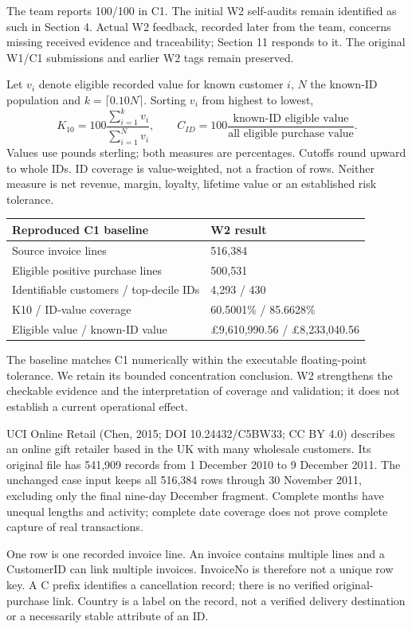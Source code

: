 \documentclass[10pt,a4paper]{article}
\newcommand{\sectionhead}[1]{\Needspace{8\baselineskip}\vspace{.4em}{\large\bfseries\color{navy}#1}\par\vspace{.1em}}
\begin{document}
The team reports 100/100 in C1. The initial W2 self-audits remain identified as such in Section 4. Actual W2 feedback, recorded later from the team, concerns missing received evidence and traceability; Section 11 responds to it. The original W1/C1 submissions and earlier W2 tags remain preserved.

Let $v_i$ denote eligible recorded value for known customer $i$, $N$ the known-ID population and $k=\lceil0.10N\rceil$. Sorting $v_i$ from highest to lowest,
\[
K_{10}=100\frac{\sum_{i=1}^{k}v_i}{\sum_{i=1}^{N}v_i},\qquad
C_{ID}=100\frac{\text{known-ID eligible value}}{\text{all eligible purchase value}}.
\]
Values use pounds sterling; both measures are percentages. Cutoffs round upward to whole IDs. ID coverage is value-weighted, not a fraction of rows. Neither measure is net revenue, margin, loyalty, lifetime value or an established risk tolerance.

\begin{tabularx}{\linewidth}{@{}YY@{}}
\toprule
\textbf{Reproduced C1 baseline} & \textbf{W2 result} \\ \midrule
Source invoice lines & 516,384 \\
Eligible positive purchase lines & 500,531 \\
Identifiable customers / top-decile IDs & 4,293 / 430 \\
K10 / ID-value coverage & 60.5001\% / 85.6628\% \\
Eligible value / known-ID value & \pounds{}9,610,990.56 / \pounds{}8,233,040.56 \\
\bottomrule\end{tabularx}

The baseline matches C1 numerically within the executable floating-point tolerance. We retain its bounded concentration conclusion. W2 strengthens the checkable evidence and the interpretation of coverage and validation; it does not establish a current operational effect.
\clearpage
\sectionhead{2\quad Source, dictionary and analytical scope}
UCI Online Retail (Chen, 2015; DOI 10.24432/C5BW33; CC BY 4.0) describes an online gift retailer based in the UK with many wholesale customers. Its original file has 541,909 records from 1 December 2010 to 9 December 2011. The unchanged case input keeps all 516,384 rows through 30 November 2011, excluding only the final nine-day December fragment. Complete months have unequal lengths and activity; complete date coverage does not prove complete capture of real transactions.

One row is one recorded invoice line. An invoice contains multiple lines and a CustomerID can link multiple invoices. InvoiceNo is therefore not a unique row key. A C prefix identifies a cancellation record; there is no verified original-purchase link. Country is a label on the record, not a verified delivery destination or a necessarily stable attribute of an ID.
\end{document}
